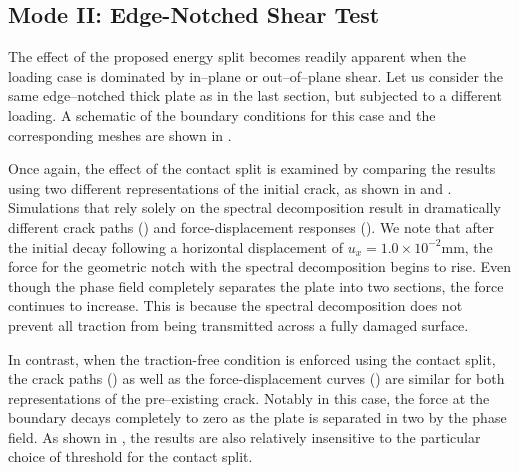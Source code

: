 

\subsection{Mode II: Edge-Notched Shear Test}

The effect of the proposed energy split becomes readily apparent when the loading case is dominated by in--plane or out--of--plane shear. Let us consider the same edge--notched thick plate as in the last section, but subjected to a different loading. A schematic of the boundary conditions for this case and the corresponding meshes are shown in .





Once again, the effect of the contact split is examined by comparing the results using two different representations of the initial crack, as shown in  and .
Simulations that rely solely on the spectral decomposition result in dramatically different crack paths ()
and force-displacement responses (). We note that after the initial decay following a horizontal displacement of $u_x = 1.0\times 10^{-2}$mm, the force for the geometric notch with the spectral decomposition begins to rise.  Even though the phase field completely separates the plate into two sections, the force continues to increase.  This is because the spectral decomposition does not prevent all traction from being transmitted across a fully damaged surface.

In contrast, when the traction-free condition is enforced using the contact split, the crack paths () as well as the force-displacement curves () are similar for both representations of the pre--existing crack.
Notably in this case, the force at the boundary decays completely to zero as the plate is separated in two by the phase field.   As shown in , the results are also relatively insensitive to the particular choice of threshold for the contact split.

